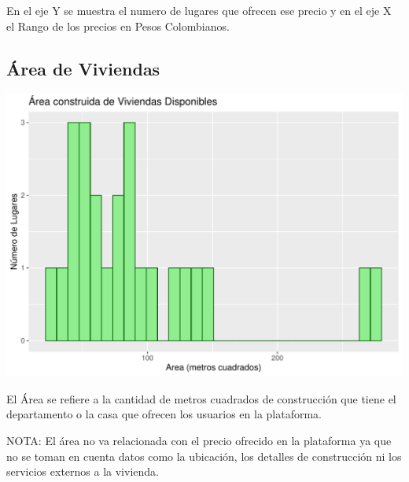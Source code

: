 \documentclass[
  landscape]{article}
\begin{document}
En el eje Y se muestra el numero de lugares que ofrecen ese precio y en
el eje X el Rango de los precios en Pesos Colombianos.

\hypertarget{uxe1rea-de-viviendas}{%
\subsection{Área de Viviendas}\label{uxe1rea-de-viviendas}}

\begin{center}\includegraphics{BI_reporting_files/figure-latex/Grafica_superficie -1} \end{center}

El Área se refiere a la cantidad de metros cuadrados de construcción que
tiene el departamento o la casa que ofrecen los usuarios en la
plataforma.

NOTA: El área no va relacionada con el precio ofrecido en la plataforma
ya que no se toman en cuenta datos como la ubicación, los detalles de
construcción ni los servicios externos a la vivienda.
\end{document}
